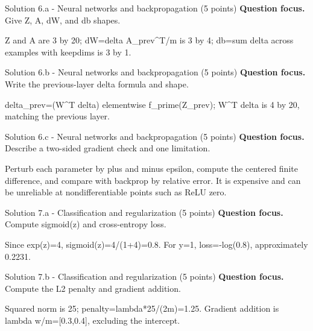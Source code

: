 \documentclass[aspectratio=169,11pt]{beamer}
\begin{document}
\begin{frame}{Solution 6.a - Neural networks and backpropagation (5 points)}
\small
\textbf{Question focus.} Give Z, A, dW, and db shapes.

\vspace{0.25cm}
\answerlabel Z and A are 3 by 20; dW=delta A\_prev\textasciicircum{}T/m is 3 by 4; db=sum delta across examples with keepdims is 3 by 1.
\end{frame}

\begin{frame}{Solution 6.b - Neural networks and backpropagation (5 points)}
\small
\textbf{Question focus.} Write the previous-layer delta formula and shape.

\vspace{0.25cm}
\answerlabel delta\_prev=(W\textasciicircum{}T delta) elementwise f\_prime(Z\_prev); W\textasciicircum{}T delta is 4 by 20, matching the previous layer.
\end{frame}

\begin{frame}{Solution 6.c - Neural networks and backpropagation (5 points)}
\small
\textbf{Question focus.} Describe a two-sided gradient check and one limitation.

\vspace{0.25cm}
\answerlabel Perturb each parameter by plus and minus epsilon, compute the centered finite difference, and compare with backprop by relative error. It is expensive and can be unreliable at nondifferentiable points such as ReLU zero.
\end{frame}

\begin{frame}{Solution 7.a - Classification and regularization (5 points)}
\small
\textbf{Question focus.} Compute sigmoid(z) and cross-entropy loss.

\vspace{0.25cm}
\answerlabel Since exp(z)=4, sigmoid(z)=4/(1+4)=0.8. For y=1, loss=-log(0.8), approximately 0.2231.
\end{frame}

\begin{frame}{Solution 7.b - Classification and regularization (5 points)}
\small
\textbf{Question focus.} Compute the L2 penalty and gradient addition.

\vspace{0.25cm}
\answerlabel Squared norm is 25; penalty=lambda*25/(2m)=1.25. Gradient addition is lambda w/m=[0.3,0.4], excluding the intercept.
\end{frame}
\end{document}
